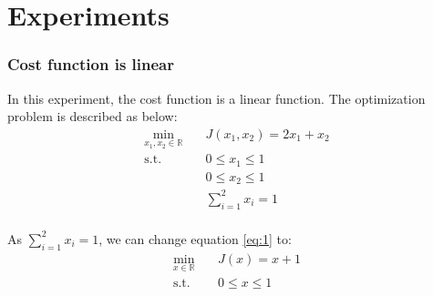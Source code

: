 \documentclass[a4paper,12pt]{article}
\begin{document}
\part{Experiments}
\section{Cost function is linear}
In this experiment, the cost function is a linear function. The optimization problem is described as below:\\


\begin{equation}\label{eq:1}
\begin{aligned}
\min_{x_1,x_2\in \mathbb{R}} \quad & J(x_1,x_2) = 2x_1+x_2\\
\textrm{s.t.} \quad & 0 \leq x_1 \leq 1\\
              \quad & 0 \leq x_2 \leq 1\\
              \quad & \sum_{i=1}^{2} x_i = 1\\
\end{aligned}
\end{equation}


As $\sum_{i=1}^{2} x_i = 1$, we can change equation \ref{eq:1} to:\\
\begin{equation}\label{eq:2}
\begin{aligned}
\min_{x\in \mathbb{R}} \quad & J(x) = x+1\\
\textrm{s.t.} \quad & 0 \leq x \leq 1\\
\end{aligned}
\end{equation}


\end{document}
